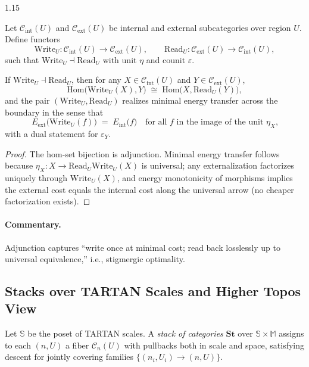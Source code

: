 \documentclass[12pt,a4paper]{article}
\begin{document}
\begin{spacing}{1.15}
\begin{definition}
Let $\mathcal{C}_{\mathrm{int}}(U)$ and $\mathcal{C}_{\mathrm{ext}}(U)$ be internal and external subcategories over region $U$.
Define functors
\[
\mathrm{Write}_U:\mathcal{C}_{\mathrm{int}}(U)\to\mathcal{C}_{\mathrm{ext}}(U),
\qquad
\mathrm{Read}_U:\mathcal{C}_{\mathrm{ext}}(U)\to\mathcal{C}_{\mathrm{int}}(U),
\]
such that $\mathrm{Write}_U\dashv \mathrm{Read}_U$ with unit $\eta$ and counit $\varepsilon$.
\end{definition}

\begin{proposition}
\label{prop:adjunction-energy}
If $\mathrm{Write}_U\dashv \mathrm{Read}_U$, then for any $X\in\mathcal{C}_{\mathrm{int}}(U)$ and $Y\in\mathcal{C}_{\mathrm{ext}}(U)$,
\[
\mathrm{Hom}\big(\mathrm{Write}_U(X),Y\big)\;\cong\;\mathrm{Hom}\big(X,\mathrm{Read}_U(Y)\big),
\]
and the pair $(\mathrm{Write}_U,\mathrm{Read}_U)$ realizes minimal energy transfer across the boundary in the sense that
\[
E_{\mathrm{ext}}\big(\mathrm{Write}_U(f)\big)
\;=\;
E_{\mathrm{int}}\big(f\big)
\quad\text{for all $f$ in the image of the unit $\eta_X$,}
\]
with a dual statement for $\varepsilon_Y$.
\end{proposition}

\begin{proof}
The hom-set bijection is adjunction. Minimal energy transfer follows because $\eta_X:X\to \mathrm{Read}_U\mathrm{Write}_U(X)$ is universal; any externalization factorizes uniquely through $\mathrm{Write}_U(X)$, and energy monotonicity of morphisms implies the external cost equals the internal cost along the universal arrow (no cheaper factorization exists).
\end{proof}

\paragraph{Commentary.}
Adjunction captures “write once at minimal cost; read back losslessly up to universal equivalence,” i.e., stigmergic optimality.

\subsection{Stacks over TARTAN Scales and Higher Topos View}

\begin{definition}
Let $\mathbb{S}$ be the poset of TARTAN scales. A \emph{stack of categories} $\mathbf{St}$ over $\mathbb{S}\times \mathbb{M}$ assigns to each $(n,U)$ a fiber $\mathscr{C}_n(U)$ with pullbacks both in scale and space, satisfying descent for jointly covering families $\{(n_i,U_i)\to(n,U)\}$.
\end{definition}


\end{spacing}
\end{document}
